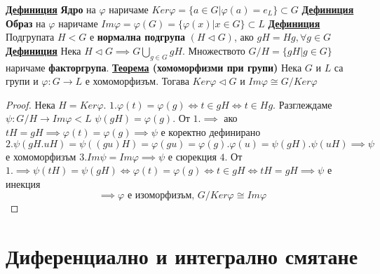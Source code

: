 \documentclass{article}
\begin{document}
\textbf{\underline{Дефиниция}}
\textbf{Ядро} на $\varphi$ наричаме $Ker \varphi = \{a \in G | \varphi(a) = e_L\} \subset G$ \newline\newline
\textbf{\underline{Дефиниция}}
\textbf{Образ} на $\varphi$ наричаме $Im \varphi = \varphi(G) = \{\varphi(x) | x \in G\} \subset L$ \newline\newline
\textbf{\underline{Дефиниция}}
Подгрупата $H < G$ е \textbf{нормална подгрупа} $(H \triangleleft G)$, ако $gH = Hg, \forall g \in G$ \newline\newline
\textbf{\underline{Дефиниция}}
Нека $H \triangleleft G \implies G \bigcup\limits_{g \in G}gH$. Множеството $G/H = \{gH|g \in G\}$ наричаме
\textbf{факторгрупа}. \newline\newline
\textbf{\underline{Теорема} (хомоморфизми при групи)} \newline
Нека $G$ и $L$ са групи и $\varphi : G \rightarrow L$ е хомоморфизъм. Тогава $Ker \varphi \triangleleft G$
и $Im \varphi \cong G / Ker \varphi$
\begin{proof}
Нека $H = Ker\varphi$. \newline\newline
$1. \varphi(t) = \varphi(g) \iff t \in gH \iff t \in Hg$. \newline Разглеждаме $\psi: G/H \rightarrow Im\varphi < L$
$\psi(gH) = \varphi(g)$. \newline От $1. \implies$ ако $tH = gH \implies \varphi(t) = \varphi(g) \implies \psi$ е
коректно дефинирано \newline\newline
$2. \psi(gH.uH) = \psi((gu)H) = \varphi(gu) = \varphi(g).\varphi(u) = \psi(gH).\psi(uH) \implies \psi$ е хомоморфизъм \newline\newline
$3.Im\psi = Im\varphi \implies \psi$ е сюрекция \newline\newline
$4.$ От $1. \implies \psi(tH) = \psi(gH) \iff \varphi(t) = \varphi(g) \iff t \in gH \iff tH = gH \implies \psi$ е инекция
$$\implies \varphi \text{ е изоморфизъм, } G/Ker\varphi \cong Im\varphi$$
\end{proof}

\section*{Диференциално и интегрално смятане}
\end{document}
